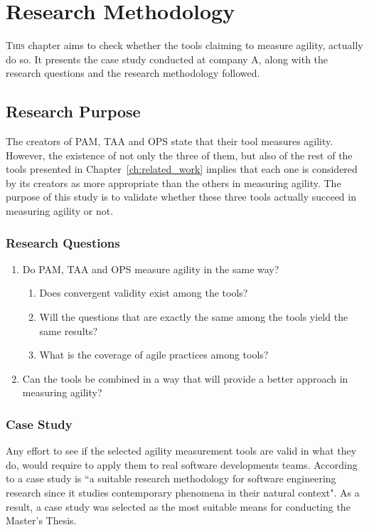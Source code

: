 \chapter{Research Methodology}
\label{ch:research_methodology}


\lettrine[lines=4, loversize=-0.1, lraise=0.1]{T}{his} chapter aims to check whether the tools claiming to measure agility, actually do so. It presents the case study conducted at company A, along with the research questions and the research methodology followed.

\section{Research Purpose}
The creators of \ac{PAM}, \ac{TAA} and \ac{OPS} state that their tool measures agility. However, the existence of not only the three of them, but also of the rest of the tools presented in Chapter~\ref{ch:related_work} implies that each one is considered by its creators as more appropriate than the others in measuring agility. The purpose of this study is to validate whether these three tools actually succeed in measuring agility or not. 

\subsection{Research Questions}
\begin{enumerate}
	\item Do \ac{PAM}, \ac{TAA} and \ac{OPS} measure agility in the same way?
	\begin{enumerate}[label={\roman*)},align=left]
  		\item Does convergent validity exist among the tools?
  		\item Will the questions that are exactly the same among the tools yield the same results?
		\item What is the coverage of agile practices among tools?
	\end{enumerate}	
  	\item Can the tools be combined in a way that will provide a better approach in measuring agility?
\end{enumerate}

\subsection{Case Study}
Any effort to see if the selected agility measurement tools are valid in what they do, would require to apply them to real software developments teams. According to \citet{Runeson_Host} a case study is ``a suitable research methodology for software engineering research since it studies contemporary phenomena in their natural context". As a result, a case study was selected as the most suitable means for conducting the Master's Thesis.  

